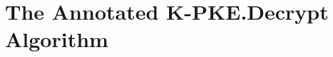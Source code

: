 \documentclass[12pt]{article}
\begin{document}
\newpage
\section{The Annotated K-PKE.Decrypt Algorithm}

\begin{algorithm}[H]
\caption*{\textbf{Annotated Algorithm 15} $\Name{K-PKE.Decrypt}(\DKPKE:\mathbb{B}^{384k}, c:\mathbb{B}^{32(d_u k + d_v)}) \rightarrow m: \mathbb{B}^{32}$}
\begin{algorithmic}[1]





\State{$ \HatBoldS \is \ByteDecodeQ(\DKPKE) $}

    {}


\end{algorithmic}
\end{algorithm}
\end{document}
